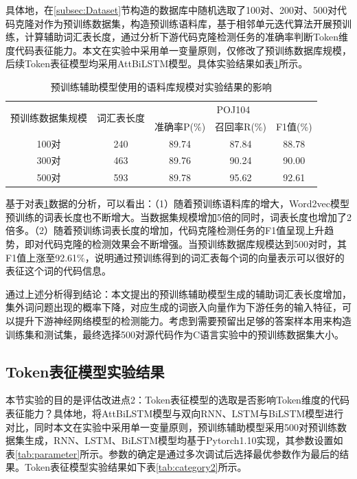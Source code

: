 具体地，在\ref{subsec:Dataset}节构造的数据库中随机选取了100对、200对、500对代码克隆对作为预训练数据集，构造预训练语料库，基于相邻单元迭代算法开展预训练，计算辅助词汇表长度，通过分析下游代码克隆检测任务的准确率判断Token维度代码表征能力。本文在实验中采用单一变量原则，仅修改了预训练数据库规模，后续Token表征模型均采用AttBiLSTM模型。具体实验结果如表\ref{tab:category}所示。

\begin{table}[htbp]
  \centering  
  \caption{预训练辅助模型使用的语料库规模对实验结果的影响}   
  \label{tab:category}  
  \begin{tabular*}{0.9\textwidth}{@{\extracolsep{\fill}}ccccc}  
  \toprule
  \multirow{2}{*}{预训练数据集规模} & \multirow{2}{*}{词汇表长度} & \multicolumn{3}{c}{POJ104} \\
  \cmidrule{3-5} 
   & & 准确率P(\%) & 召回率R(\%) & F1值(\%)  \\  
  \midrule 
  100对	&240		& 89.74	& 87.84	& 88.78		 \\  
  300对	&463		& 89.76	& 90.24	& 90.00	 \\  
  500对	&593 	  & 89.78	& 95.62	& 92.61	   \\  
  \bottomrule  
  \end{tabular*}  
\end{table}

基于对表\ref{tab:category}数据的分析，可以看出：（1）随着预训练语料库的增大，Word2vec模型预训练的词表长度也不断增大。当数据集规模增加5倍的同时，词表长度也增加了2倍多。（2）随着预训练词表长度的增加，代码克隆检测任务的F1值呈现上升趋势，即对代码克隆的检测效果会不断增强。当预训练数据库规模达到500对时，其F1值上涨至92.61\%，说明通过预训练得到的词汇表每个词的向量表示可以很好的表征这个词的代码信息。

通过上述分析得到结论：本文提出的预训练辅助模型生成的辅助词汇表长度增加，集外词问题出现的概率下降，对应生成的词嵌入向量作为下游任务的输入特征，可以提升下游神经网络模型的检测能力。考虑到需要预留出足够的答案样本用来构造训练集和测试集，最终选择500对源代码作为C语言实验中的预训练数据集大小。

\subsection{Token表征模型实验结果}
\label{subsec:TokenResult2}

本节实验的目的是评估改进点2：Token表征模型的选取是否影响Token维度的代码表征能力？具体地，将AttBiLSTM模型与双向RNN、LSTM与BiLSTM模型进行对比，同时本文在实验中采用单一变量原则，预训练辅助模型采用500对预训练数据集生成，RNN、LSTM、BiLSTM模型均基于Pytorch1.10实现，其参数设置如表\ref{tab:parameter}所示。参数的确定是通过多次调试后选择最优参数作为最后的结果。Token表征模型实验结果如下表\ref{tab:category2}所示。

